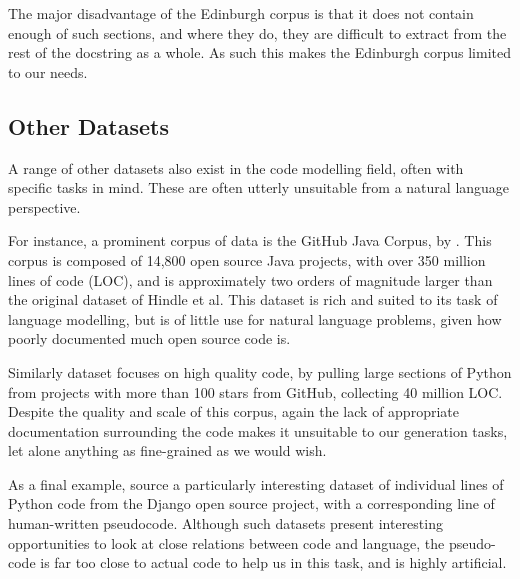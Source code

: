 The major disadvantage of the Edinburgh corpus is that it does not contain enough of such sections, and where they do, they are difficult to extract from the rest of the docstring as a whole.
As such this makes the Edinburgh corpus limited to our needs.


\subsection{Other Datasets}
A range of other datasets also exist in the code modelling field, often with specific tasks in mind. These are often utterly unsuitable from a natural language perspective.

For instance, a prominent corpus of data is the GitHub Java Corpus, by \citet{allamanis_mining_2013}. This corpus is composed of 14,800 open source Java projects, with over 350 million lines of code (LOC), and is approximately two orders of magnitude larger than the original dataset of Hindle et al. This dataset is rich and suited to its task of language modelling, but is of little use for natural language problems, given how poorly documented much open source code is.

Similarly \citet{bhoopchand_learning_2016} dataset focuses on high quality code, by pulling large sections of Python from projects with more than 100 stars from GitHub, collecting 40 million LOC. 
Despite the quality and scale of this corpus, again the lack of appropriate documentation surrounding the code makes it unsuitable to our generation tasks, let alone anything as fine-grained as we would wish.

As a final example, \citet{y._oda_learning_2015} source a particularly interesting dataset of individual lines of Python code from the Django open source project, with a corresponding line of human-written pseudocode. Although such datasets present interesting opportunities to look at close relations between code and language, the pseudo-code is far too close to actual code to help us in this task, and is highly artificial. 






